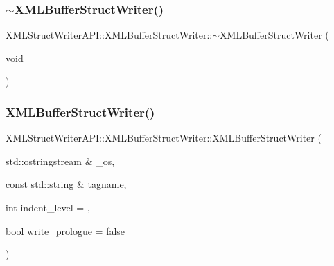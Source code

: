 \subsubsection{\texorpdfstring{$\sim$XMLBufferStructWriter()}{~XMLBufferStructWriter()}\hspace{0.1cm}{\footnotesize\ttfamily [1/2]}}
{\footnotesize\ttfamily X\+M\+L\+Struct\+Writer\+A\+P\+I\+::\+X\+M\+L\+Buffer\+Struct\+Writer\+::$\sim$\+X\+M\+L\+Buffer\+Struct\+Writer (\begin{DoxyParamCaption}\item[{void}]{ }\end{DoxyParamCaption})\hspace{0.3cm}{\ttfamily [inline]}}

\mbox{\label{classXMLStructWriterAPI_1_1XMLBufferStructWriter_adc348003ff0e12b5a820972cbc51a376}} 
\subsubsection{\texorpdfstring{XMLBufferStructWriter()}{XMLBufferStructWriter()}\hspace{0.1cm}{\footnotesize\ttfamily [2/2]}}
{\footnotesize\ttfamily X\+M\+L\+Struct\+Writer\+A\+P\+I\+::\+X\+M\+L\+Buffer\+Struct\+Writer\+::\+X\+M\+L\+Buffer\+Struct\+Writer (\begin{DoxyParamCaption}\item[{std\+::ostringstream \&}]{\+\_\+os,  }\item[{const std\+::string \&}]{tagname,  }\item[{int}]{indent\+\_\+level = {},  }\item[{bool}]{write\+\_\+prologue = {\ttfamily false} }\end{DoxyParamCaption})\hspace{0.3cm}{\ttfamily [inline]}}

